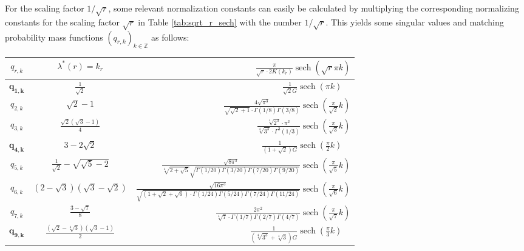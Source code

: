 \documentclass[12pt]{amsart}
\theoremstyle{definition}
\theoremstyle{remark}
\numberwithin{equation}{section}
\newcommand{\1}{\mathbbm{1}}
\begin{document}
For the scaling factor $1/\sqrt{r}$, some relevant normalization constants can easily be calculated by multiplying the corresponding normalizing constants for the scaling factor $\sqrt{r}$ in Table \ref{tab:sqrt_r_sech} with the number $1/\sqrt{r}$. This yields some singular values and matching probability mass functions $\left(q_{r,k}\right)_{k \in \mathbb{Z}}$ as follows:

\renewcommand{\arraystretch}{2}
\begin{table}[t]
    \centering
    \begin{tabular}{c|c|r}
$q_{r,k}$  &   $ \lambda^*(r) = k_r$ & $\frac{\pi}{\sqrt{r} \cdot 2K(k_r)}\operatorname{sech} (\sqrt{r}\pi k)$\\
\hline
$\mathbf{q_{1,k}}$  & $\frac{1}{\sqrt{2}}$ & $\frac{1}{\sqrt{2}G} \operatorname{sech} \left(\pi k\right)\quad  $\\
$q_{2,k}$  & $\sqrt{2}-1$ & $\frac{4\sqrt{\pi^3}}{\sqrt{\sqrt{2}+1} \cdot \Gamma(1/8)\Gamma(3/8)} \operatorname{sech} \left(\frac{\pi}{\sqrt{2}} k\right)$\\
$q_{3,k}$  & $\frac{\sqrt{2}\left(\sqrt{3}-1\right)}{4}$ & $\frac{\sqrt[4]{2^3} \cdot \pi^2 }{\sqrt[4]{3^3} \cdot \Gamma^3(1/3)}\operatorname{sech} \left(\frac{\pi}{\sqrt{3}} k\right)$\\
$\mathbf{q_{4,k}}$  & $3-2\sqrt{2}$ & $\frac{1}{(1 + \sqrt{2})G}\operatorname{sech} \left(\frac{\pi}{2} k\right)\quad$\\
$q_{5,k}$  & $\frac{1}{\sqrt{2}} - \sqrt{\sqrt{5}-2}$ & $\frac{\sqrt{8 \pi^3}}{\sqrt[4]{2+\sqrt{5}} \sqrt{\Gamma(1/20)\Gamma(3/20)\Gamma(7/20)\Gamma(9/20)}} \operatorname{sech} \left(\frac{\pi}{\sqrt{5}} k\right)$\\
$q_{6,k}$  & $\left(2-\sqrt{3}\right)\left(\sqrt{3}-\sqrt{2}\right)$ & $\frac{\sqrt{16 \pi^3}}{\sqrt{(1 +\sqrt{2}+\sqrt{6}) \cdot \Gamma(1/24)\Gamma(5/24)\Gamma(7/24)\Gamma(11/24)}} \operatorname{sech} \left(\frac{\pi}{\sqrt{6}} k\right)$\\
$q_{7,k}$  & $\frac{3-\sqrt{7}}{8}$ & $\frac{2\pi^2}{\sqrt[4]{7} \cdot \Gamma(1/7)\Gamma(2/7)\Gamma(4/7)} \operatorname{sech} \left(\frac{\pi}{\sqrt{7}} k\right)$\\
$\mathbf{q_{9,k}}$  & $\frac{\left(\sqrt{2}-\sqrt[4]{3}\right)\left(\sqrt{3}-1\right)}{2}$ & $\frac{1}{\left(\sqrt[4]{3^3} + \sqrt[4]{3} \right) G} \operatorname{sech} \left(\frac{\pi}{3} k\right)\quad$\\

\end{tabular}
\end{table}
\end{document}
